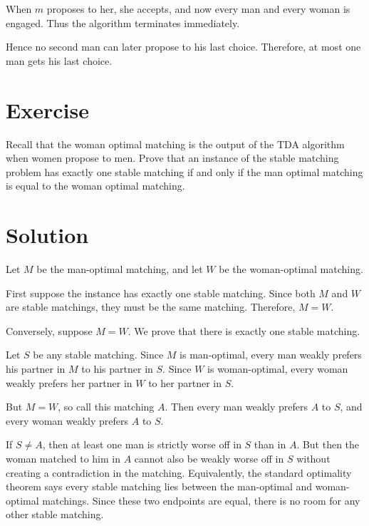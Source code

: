 \documentclass[14pt]{extreport}
\newcounter{counter}
\newcommand{\Exercise}{Exercise \stepcounter{counter}\thecounter}
\begin{document}
    \vspace{3mm}
    When $m$ proposes to her, she accepts, and now every man and every woman is engaged. Thus the algorithm terminates immediately.

    \vspace{3mm}
    Hence no second man can later propose to his last choice. Therefore, at most one man gets his last choice.

\section*{\Exercise}
    Recall that the woman optimal matching is the output of the TDA algorithm when women propose to men. Prove that an instance of the stable matching problem has exactly one stable matching if and only if the man optimal matching is equal to the woman optimal matching.

\section*{Solution}
    Let $M$ be the man-optimal matching, and let $W$ be the woman-optimal matching.

    \vspace{3mm}
    First suppose the instance has exactly one stable matching. Since both $M$ and $W$ are stable matchings, they must be the same matching. Therefore, $M = W.$

    \vspace{3mm}
    Conversely, suppose $M = W.$
    We prove that there is exactly one stable matching.

    \vspace{3mm}
    Let $S$ be any stable matching. Since $M$ is man-optimal, every man weakly prefers his partner in $M$ to his partner in $S$. Since $W$ is woman-optimal, every woman weakly prefers her partner in $W$ to her partner in $S$.

    \vspace{3mm}
    But $M = W$, so call this matching $A$. Then every man weakly prefers $A$ to $S$, and every woman weakly prefers $A$ to $S$.

    \vspace{3mm}
    If $S \neq A$, then at least one man is strictly worse off in $S$ than in $A$. But then the woman matched to him in $A$ cannot also be weakly worse off in $S$ without creating a contradiction in the matching. Equivalently, the standard optimality theorem says every stable matching lies between the man-optimal and woman-optimal matchings. Since these two endpoints are equal, there is no room for any other stable matching.
\end{document}
